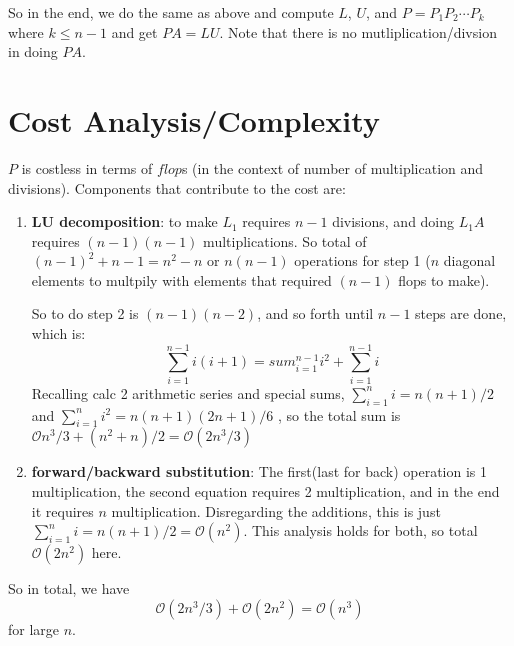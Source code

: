 So in the end, we do the same as above and compute $L$, $U$, and
$P=P_1P_2\cdots P_{k}$ where $k\le n-1$ and get $PA=LU$. Note that there is no
mutliplication/divsion in doing $PA$.

\section{Cost Analysis/Complexity}
$P$ is costless in terms of $flop$s (in the context of number of
multiplication and divisions). Components that contribute to the cost are:
\begin{enumerate}
\item \textbf{LU decomposition}: to make $L_1$ requires $n-1$ divisions, and
  doing  $L_1A$ requires $(n-1)(n-1)$ multiplications. So total of $(n-1)^2 + n-1
  = n^2-n$ or $n(n-1)$ operations for step 1 ($n$ diagonal elements
  to multpily with elements that required $(n-1)$ flops to make).

So to do step 2 is $(n-1)(n-2)$, and so forth until $n-1$ steps are done, which is:
$$\sum_{i=1}^{n-1} i(i+1) = sum_{i=1}^{n-1}i^2 + \sum_{i=1}^{n-1}i$$
Recalling calc 2 arithmetic series and special sums, $\sum_{i=1}^ni =
n(n+1)/2$ and $\sum_{i=1}^ni^2 =n(n+1)(2n+1)/6$ , so the total sum is
$\mathcal{O}n^3/3+(n^2+n)/2 = \mathcal{O}(2n^3/3)$
\item \textbf{forward/backward substitution}: The first(last for back)
  operation is 1 multiplication, the second equation requires 2
  multiplication, and in the end it requires $n$
  multiplication. Disregarding the additions, this is just
  $\sum_{i=1}^n i = n(n+1)/2 = \mathcal{O}(n^2)$. This analysis holds
  for both, so total $\mathcal{O}(2n^2)$ here.
\end{enumerate}
\noi
So in total, we have $$\mathcal{O}(2n^3/3) + \mathcal{O}(2n^2) =
\mathcal{O}(n^3)$$
for large $n$.

